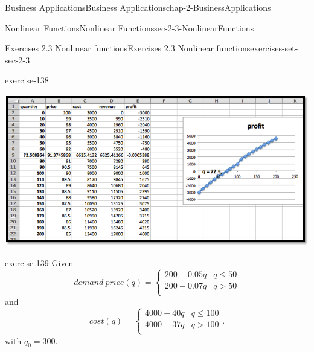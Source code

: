 \documentclass[oneside,10pt,]{book}
\numberwithin{equation}{section}
\newcommand{\gt}{>}
\begin{document}
\begin{chapterptx}{Business Applications}{}{Business Applications}{}{}{chap-2-BusinessApplications}
\begin{sectionptx}{Nonlinear Functions}{}{Nonlinear Functions}{}{}{sec-2-3-NonlinearFunctions}
\begin{exercises-subsection-numberless}{Exercises 2.3 Nonlinear functions}{}{Exercises 2.3 Nonlinear functions}{}{}{exercises-set-sec-2-3}
\begin{exercisegroup}
\begin{divisionexerciseeg}{23}{}{}{exercise-138}
\begin{enumerate}[label=(\alph*)]
\begin{sidebyside}{1}{0}{0}{0}%
\begin{sbspanel}{1}%
\includegraphics[width=1\linewidth]{images/sec2-3-sol23a.png}
\end{sbspanel}%
\end{sidebyside}%
%
\end{enumerate}
\end{divisionexerciseeg}%
\begin{divisionexerciseeg}{24}{}{}{exercise-139}%
\hypertarget{p-894}{}%
Given%
%
\begin{equation*}
demand\ price(q)=\begin{cases}
200-0.05q&q \le 50\\
200-0.07q&q \gt 50\\
\end{cases}
\end{equation*}
\hypertarget{p-895}{}%
and%
%
\begin{equation*}
cost(q)=\begin{cases}
4000+40q&q \le 100\\
4000+37q&q \gt 100\\
\end{cases}.
\end{equation*}
\hypertarget{p-896}{}%
with \(q_0=300\).%
\end{divisionexerciseeg}%
\end{exercisegroup}
\par\medskip\noindent
\end{exercises-subsection-numberless}
\end{sectionptx}
\end{chapterptx}
%
%
\typeout{************************************************}
\typeout{************************************************}
%
\end{document}
